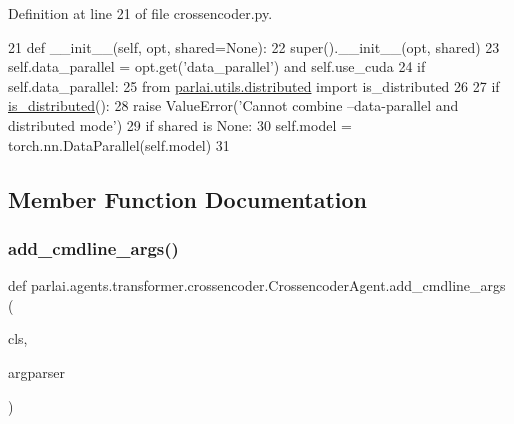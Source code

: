 Definition at line 21 of file crossencoder.\+py.


\begin{DoxyCode}
21     \textcolor{keyword}{def }\_\_init\_\_(self, opt, shared=None):
22         super().\_\_init\_\_(opt, shared)
23         self.data\_parallel = opt.get(\textcolor{stringliteral}{'data\_parallel'}) \textcolor{keywordflow}{and} self.use\_cuda
24         \textcolor{keywordflow}{if} self.data\_parallel:
25             \textcolor{keyword}{from} \hyperlink{namespaceparlai_1_1utils_1_1distributed}{parlai.utils.distributed} \textcolor{keyword}{import} is\_distributed
26 
27             \textcolor{keywordflow}{if} \hyperlink{namespaceparlai_1_1utils_1_1distributed_a023acb5e3b66e1f27e21247c35661279}{is\_distributed}():
28                 \textcolor{keywordflow}{raise} ValueError(\textcolor{stringliteral}{'Cannot combine --data-parallel and distributed mode'})
29             \textcolor{keywordflow}{if} shared \textcolor{keywordflow}{is} \textcolor{keywordtype}{None}:
30                 self.model = torch.nn.DataParallel(self.model)
31 
\end{DoxyCode}


\subsection{Member Function Documentation}
\mbox{\label{classparlai_1_1agents_1_1transformer_1_1crossencoder_1_1CrossencoderAgent_a931cdceebd1eceb9c20638271c86af7a}} 
\subsubsection{\texorpdfstring{add\+\_\+cmdline\+\_\+args()}{add\_cmdline\_args()}}
{\footnotesize\ttfamily def parlai.\+agents.\+transformer.\+crossencoder.\+Crossencoder\+Agent.\+add\+\_\+cmdline\+\_\+args (\begin{DoxyParamCaption}\item[{}]{cls,  }\item[{}]{argparser }\end{DoxyParamCaption})}

